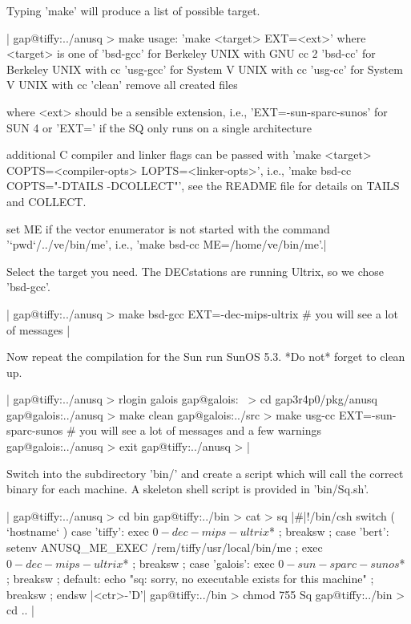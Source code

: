 Typing 'make' will produce a list of possible target.

|    gap@tiffy:../anusq > make
    usage: 'make <target> EXT=<ext>'  where <target> is one of
    'bsd-gcc'    for Berkeley UNIX with GNU cc 2
    'bsd-cc'     for Berkeley UNIX with cc
    'usg-gcc'    for System V UNIX with cc
    'usg-cc'     for System V UNIX with cc
    'clean'      remove all created files

       where <ext> should be a sensible extension, i.e.,
       'EXT=-sun-sparc-sunos' for SUN 4 or 'EXT=' if the SQ only
       runs on a single architecture

       additional C compiler and linker flags can be passed with
       'make <target> COPTS=<compiler-opts> LOPTS=<linker-opts>',
       i.e., 'make bsd-cc COPTS="-DTAILS -DCOLLECT"', see the
       README file for details on TAILS and COLLECT.

       set ME if the vector enumerator is not started with the
       command '`pwd`/../ve/bin/me',
       i.e., 'make bsd-cc ME=/home/ve/bin/me'.|

Select  the target you  need.  The DECstations  are running Ultrix, so we
chose 'bsd-gcc'.

|    gap@tiffy:../anusq > make bsd-gcc EXT=-dec-mips-ultrix
    # you will see a lot of messages |

Now repeat the compilation for the Sun run SunOS  5.3. *Do not* forget to
clean up.

|    gap@tiffy:../anusq > rlogin galois
    gap@galois:~ > cd gap3r4p0/pkg/anusq
    gap@galois:../anusq > make clean
    gap@galois:../src > make usg-cc EXT=-sun-sparc-sunos
    # you will see a lot of messages and a few warnings
    gap@galois:../anusq > exit
    gap@tiffy:../anusq > |

Switch into the subdirectory 'bin/'  and create a  script which will call
the correct binary for each machine. A skeleton  shell script is provided
in 'bin/Sq.sh'.

|    gap@tiffy:../anusq > cd bin
    gap@tiffy:../bin > cat > sq
    |\#|!/bin/csh
    switch ( `hostname` )
      case 'tiffy':
        exec $0-dec-mips-ultrix $* ;
        breaksw ;
      case 'bert':
        setenv ANUSQ_ME_EXEC /rem/tiffy/usr/local/bin/me ;
        exec $0-dec-mips-ultrix $* ;
        breaksw ;
      case 'galois':
        exec $0-sun-sparc-sunos $* ;
        breaksw ;
      default:
        echo "sq: sorry, no executable exists for this machine" ;
        breaksw ;
    endsw
    |<ctr>-'D'|
    gap@tiffy:../bin > chmod 755 Sq
    gap@tiffy:../bin > cd .. |

